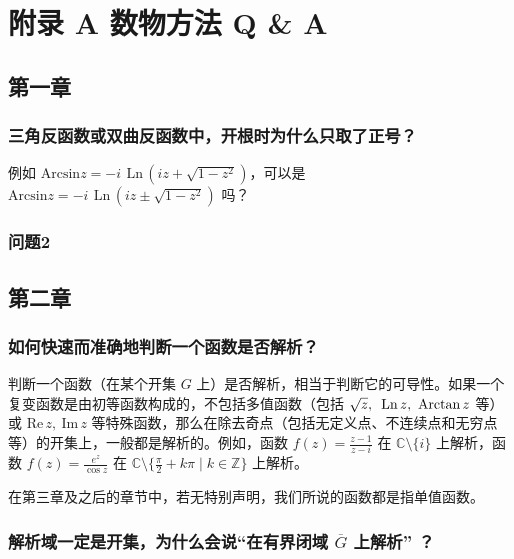 \documentclass[UTF8]{report}
\def\Im{\mathrm{Im\,}}
\def\Re{\mathrm{Re\,}}
\def\Ln{\mathrm{\,Ln\,}}
\def\Z{\mathbb{Z}}
\def\C{\mathbb{C}}
\theoremstyle{MyLineTheoremStyle} %
\theoremstyle{MyBlockTheoremStyle} %
\theoremstyle{MySubsubsectionStyle} %
\begin{document}
\chapter*{附录 A\hspace*{20pt}  数物方法 Q \& A}\setcounter{chapter}{1} 
\setcounter{equation}{0}    %
\thispagestyle{fancy} 
\setcounter{section}{0}   
\renewcommand\thesection{A.\arabic{section}}   
\renewcommand{\thefigure}{A.\arabic{figure}} 
\renewcommand{\thetable}{A.\arabic{table}}

\section{第一章}

\subsection{三角反函数或双曲反函数中，开根时为什么只取了正号？}
例如 $\mathrm{Arcsin} z = -i\ \Ln \left( iz + \sqrt{1 - z^2} \right)$，可以是 $\mathrm{Arcsin} z = -i\ \Ln \left( iz \pm \sqrt{1 - z^2} \right)$ 吗？


\subsection{问题2}

\section{第二章}


\subsection{如何快速而准确地判断一个函数是否解析？}

判断一个函数（在某个开集 $G$ 上）是否解析，相当于判断它的可导性。如果一个复变函数是由初等函数构成的，不包括多值函数（包括 $\sqrt{z},\ \Ln z,\ \text{Arctan\,} z$ 等）或 $\Re z,\ \Im z$ 等特殊函数，那么在除去奇点（包括无定义点、不连续点和无穷点等）的开集上，一般都是解析的。例如，函数 $f(z) = \frac{z - 1}{z - i}$ 在 $\C \setminus \{i\}$ 上解析，函数 $f(z) = \frac{e^z}{\cos z}$ 在 $\C \setminus \{\frac{\pi}{2} + k\pi \mid k \in \Z \}$ 上解析。

在第三章及之后的章节中，若无特别声明，我们所说的函数都是指单值函数。

\subsection{解析域一定是开集，为什么会说“在有界闭域 $\overline{G} $ 上解析” ？}\label{在闭域上解析}
\end{document}
